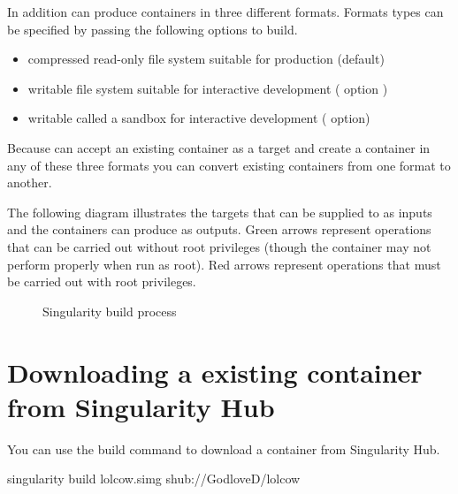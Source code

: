 \documentclass[letterpaper,10pt,english]{sphinxmanual}
\begin{document}
In addition  can produce containers in three different formats. Formats
types can be specified by passing the following options to build.
\begin{itemize}
\item {} 
compressed read-only  file system suitable for production
(default)

\item {} 
writable  file system suitable for interactive development ( 
option )

\item {} 
writable  called a sandbox for interactive
development (  option)

\end{itemize}

Because  can accept an existing container as a target and create a
container in any of these three formats you can convert existing
containers from one format to another.

The following diagram illustrates the targets that can be supplied to 
as inputs and the containers  can produce as outputs. Green arrows
represent operations that can be carried out without root privileges
(though the container may not perform properly when run as root). Red
arrows represent operations that must be carried out with root
privileges.

\begin{figure}[htbp]
\centering
\capstart

\noindent{}
\caption{Singularity build process}\label{\detokenize{build_a_container:id2}}\end{figure}


\section{Downloading a existing container from Singularity Hub}
\label{\detokenize{build_a_container:downloading-a-existing-container-from-singularity-hub}}
You can use the build command to download a container from Singularity
Hub.

%
\begin{sphinxVerbatim}[commandchars=\\\{\}]
\PYGZdl{} singularity build lolcow.simg shub://GodloveD/lolcow
\end{sphinxVerbatim}
\end{document}
